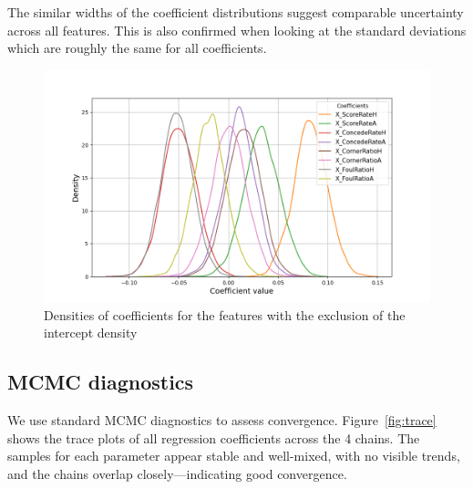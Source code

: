\documentclass[9pt]{IEEEtran}
\begin{document}
The similar widths of the coefficient distributions suggest comparable 
uncertainty across all features. This is also confirmed when looking at the 
standard deviations which are roughly the same for all coefficients. 


\begin{figure}[h]
\centering
\includegraphics[width=1\columnwidth]{figures/densities.png}
\caption{Densities of coefficients for the features with the exclusion of the 
intercept density}
\label{fig:densities}
\end{figure}



\subsection{MCMC diagnostics}
We use standard MCMC diagnostics to assess convergence.
 Figure~\ref{fig:trace} shows the trace plots of all 
 regression coefficients across the 4 chains. The samples 
 for each parameter appear stable and well-mixed, with no 
 visible trends, and the chains overlap closely—indicating good convergence.
\end{document}
